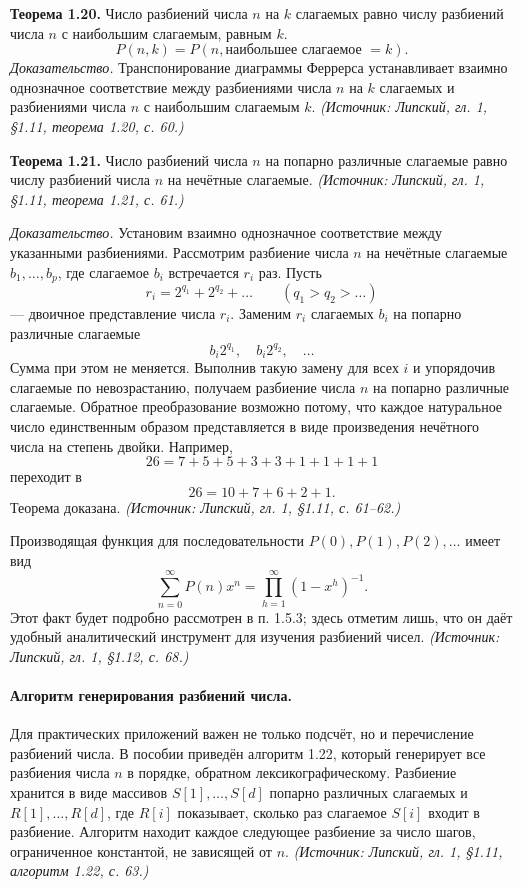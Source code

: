 \documentclass[a4paper,12pt]{article}
\begin{document}
\textbf{Теорема 1.20.} Число разбиений числа \(n\) на \(k\) слагаемых равно числу разбиений числа \(n\) с наибольшим слагаемым, равным \(k\).
\[
P(n,k)=P(n,\text{наибольшее слагаемое }=k).
\]
\emph{Доказательство.} Транспонирование диаграммы Феррерса устанавливает взаимно однозначное соответствие между разбиениями числа \(n\) на \(k\) слагаемых и разбиениями числа \(n\) с наибольшим слагаемым \(k\).
\textit{(Источник: Липский, гл. 1, §1.11, теорема 1.20, с. 60.)}

\textbf{Теорема 1.21.} Число разбиений числа \(n\) на попарно различные слагаемые равно числу разбиений числа \(n\) на нечётные слагаемые.
\textit{(Источник: Липский, гл. 1, §1.11, теорема 1.21, с. 61.)}

\emph{Доказательство.} Установим взаимно однозначное соответствие между указанными разбиениями. Рассмотрим разбиение числа \(n\) на нечётные слагаемые \(b_1,\dots,b_p\), где слагаемое \(b_i\) встречается \(r_i\) раз. Пусть
\[
r_i=2^{q_1}+2^{q_2}+\dots\qquad(q_1>q_2>\dots)
\]
--- двоичное представление числа \(r_i\). Заменим \(r_i\) слагаемых \(b_i\) на попарно различные слагаемые
\[
b_i2^{q_1},\quad b_i2^{q_2},\quad\dots
\]
Сумма при этом не меняется. Выполнив такую замену для всех \(i\) и упорядочив слагаемые по невозрастанию, получаем разбиение числа \(n\) на попарно различные слагаемые. Обратное преобразование возможно потому, что каждое натуральное число единственным образом представляется в виде произведения нечётного числа на степень двойки. Например,
\[
26=7+5+5+3+3+1+1+1+1
\]
переходит в
\[
26=10+7+6+2+1.
\]
Теорема доказана.
\textit{(Источник: Липский, гл. 1, §1.11, с. 61--62.)}

Производящая функция для последовательности \(P(0),P(1),P(2),\dots\) имеет вид
\[
\sum_{n=0}^{\infty}P(n)x^n=\prod_{h=1}^{\infty}(1-x^h)^{-1}.
\]
Этот факт будет подробно рассмотрен в п. 1.5.3; здесь отметим лишь, что он даёт удобный аналитический инструмент для изучения разбиений чисел.
\textit{(Источник: Липский, гл. 1, §1.12, с. 68.)}

\paragraph{Алгоритм генерирования разбиений числа.}
Для практических приложений важен не только подсчёт, но и перечисление разбиений числа. В пособии приведён алгоритм 1.22, который генерирует все разбиения числа \(n\) в порядке, обратном лексикографическому. Разбиение хранится в виде массивов \(S[1],\dots,S[d]\) попарно различных слагаемых и \(R[1],\dots,R[d]\), где \(R[i]\) показывает, сколько раз слагаемое \(S[i]\) входит в разбиение. Алгоритм находит каждое следующее разбиение за число шагов, ограниченное константой, не зависящей от \(n\).
\textit{(Источник: Липский, гл. 1, §1.11, алгоритм 1.22, с. 63.)}
\end{document}
